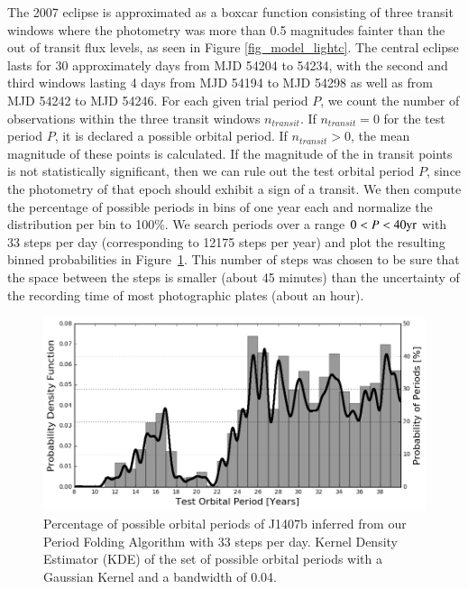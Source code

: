\documentclass[twocolumn]{aa}
\begin{document}
The 2007 eclipse is approximated as a boxcar function consisting of three transit windows where the photometry was more than 0.5 magnitudes fainter than the out of transit flux levels, as seen in Figure \ref{fig_model_lightc}.
%
The central eclipse lasts for 30 approximately days from MJD 54204 to 54234, with the second and third windows lasting 4 days from MJD 54194 to MJD 54298 as well as from MJD 54242 to MJD 54246.
%
For each given trial period $P$, we count the number of observations within the three transit windows $n_{transit}$.
%
If $n_{transit}=0$ for the test period $P$, it is declared a possible orbital period.
%
If $n_{transit}>0$, the mean magnitude of these points is calculated.
%
If the magnitude of the in transit points is not statistically significant, then we can rule out the test orbital period $P$, since the photometry of that epoch should exhibit a sign of a transit.
%
We then compute the percentage of possible periods in bins of one year each and normalize the distribution per bin to 100\%.
%
We search periods over a range $0<P<40{\rm yr}$ with 33 steps per day (corresponding to 12175 steps per year) and plot the resulting binned probabilities in Figure~\ref{fig_prob_plot}.
%
This number of steps was chosen to be sure that the space between the steps is smaller (about 45 minutes) than the uncertainty of the recording time of most photographic plates (about an hour).

\begin{figure}
\centering
\includegraphics[width=\linewidth]{kde_bars_combined_40y.png}
\caption{Percentage of possible orbital periods of J1407b inferred from our Period Folding Algorithm with 33 steps per day. Kernel Density Estimator (KDE) of the set of possible orbital periods with a Gaussian Kernel and a bandwidth of 0.04.}
\label{fig_prob_plot}
\end{figure}
\end{document}
